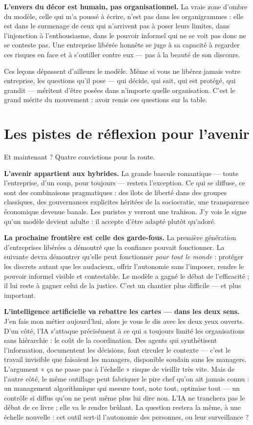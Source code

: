 \textbf{L'envers du décor est humain, pas organisationnel.} La vraie zone d'ombre du modèle, celle qui m'a poussé à écrire, n'est pas dans les organigrammes : elle est dans le surmenage de ceux qui n'arrivent pas à poser leurs limites, dans l'injonction à l'enthousiasme, dans le pouvoir informel qui ne se voit pas donc ne se conteste pas. Une entreprise libérée honnête se juge à sa capacité à regarder ces risques en face et à s'outiller contre eux — pas à la beauté de son discours.

Ces leçons dépassent d'ailleurs le modèle. Même si vous ne libérez jamais votre entreprise, les questions qu'il pose — qui décide, qui sait, qui est protégé, qui grandit — méritent d'être posées dans n'importe quelle organisation. C'est le grand mérite du mouvement : avoir remis ces questions sur la table.

\section*{Les pistes de réflexion pour l'avenir}

Et maintenant ? Quatre convictions pour la route.

\textbf{L'avenir appartient aux hybrides.} La grande bascule romantique — toute l'entreprise, d'un coup, pour toujours — restera l'exception. Ce qui se diffuse, ce sont des combinaisons pragmatiques : des îlots de liberté dans des groupes classiques, des gouvernances explicites héritées de la sociocratie, une transparence économique devenue banale. Les puristes y verront une trahison. J'y vois le signe qu'un modèle devient adulte : il accepte d'être adapté plutôt qu'adoré.

\textbf{La prochaine frontière est celle des garde-fous.} La première génération d'entreprises libérées a démontré que la confiance pouvait fonctionner. La suivante devra démontrer qu'elle peut fonctionner \emph{pour tout le monde} : protéger les discrets autant que les audacieux, offrir l'autonomie sans l'imposer, rendre le pouvoir informel visible et contestable. Le modèle a gagné le débat de l'efficacité ; il lui reste à gagner celui de la justice. C'est un chantier plus difficile — et plus important.

\textbf{L'intelligence artificielle va rebattre les cartes — dans les deux sens.} J'en fais mon métier aujourd'hui, alors je vous le dis avec les deux yeux ouverts. D'un côté, l'IA s'attaque précisément à ce qui a toujours limité les organisations sans hiérarchie : le coût de la coordination. Des agents qui synthétisent l'information, documentent les décisions, font circuler le contexte — c'est le travail invisible que faisaient les managers, disponible soudain sans les managers. L'argument « ça ne passe pas à l'échelle » risque de vieillir très vite. Mais de l'autre côté, le même outillage peut fabriquer le pire chef qu'on ait jamais connu : un management algorithmique qui mesure tout, note tout, optimise tout — un contrôle si diffus qu'on ne peut même plus lui dire non. L'IA ne tranchera pas le débat de ce livre ; elle va le rendre brûlant. La question restera la même, à une échelle nouvelle : cet outil sert-il l'autonomie des personnes, ou leur surveillance ?

